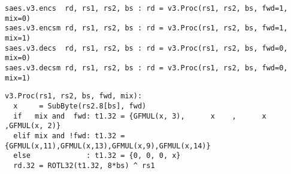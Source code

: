

\begin{lstlisting}[language=pseudo,style=block]
saes.v3.encs  rd, rs1, rs2, bs : rd = v3.Proc(rs1, rs2, bs, fwd=1, mix=0)
saes.v3.encsm rd, rs1, rs2, bs : rd = v3.Proc(rs1, rs2, bs, fwd=1, mix=1)
saes.v3.decs  rd, rs1, rs2, bs : rd = v3.Proc(rs1, rs2, bs, fwd=0, mix=0)
saes.v3.decsm rd, rs1, rs2, bs : rd = v3.Proc(rs1, rs2, bs, fwd=0, mix=1)
\end{lstlisting}


\begin{lstlisting}[language=pseudo,style=block]
v3.Proc(rs1, rs2, bs, fwd, mix):
  x     = SubByte(rs2.8[bs], fwd)
  if   mix and  fwd: t1.32 = {GFMUL(x, 3),      x    ,      x   ,GFMUL(x, 2)}
  elif mix and !fwd: t1.32 = {GFMUL(x,11),GFMUL(x,13),GFMUL(x,9),GFMUL(x,14)}
  else             : t1.32 = {0, 0, 0, x}
  rd.32 = ROTL32(t1.32, 8*bs) ^ rs1
\end{lstlisting}


